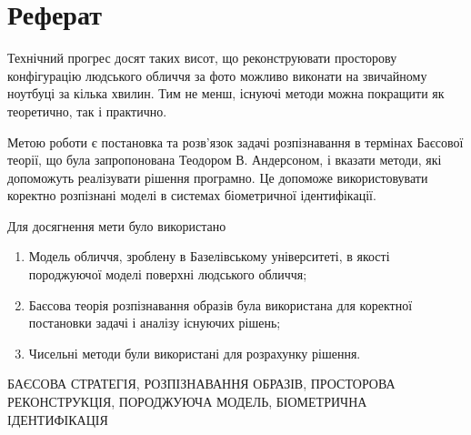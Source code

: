 \chapter*{Реферат}

Технічний прогрес досят таких висот,
що реконструювати просторову конфігурацію людського обличчя за фото
можливо виконати на звичайному ноутбуці за кілька хвилин.
Тим не менш, існуючі методи можна покращити як теоретично, так і практично.

Метою роботи є постановка та розв'язок задачі розпізнавання
в термінах Баєсової теорії, що була запропонована Теодором В. Андерсоном,
і вказати методи, які допоможуть реалізувати рішення програмно.
Це допоможе використовувати коректно розпізнані моделі
в системах біометричної ідентифікації.

Для досягнення мети було використано
\begin{enumerate}
  \item
    Модель обличчя, зроблену в Базелівському університеті,
    в якості породжуючої моделі поверхні людського обличчя;
  \item
    Баєсова теорія розпізнавання образів була використана
    для коректної постановки задачі і аналізу існуючих рішень;
  \item
    Чисельні методи були використані для розрахунку рішення.
\end{enumerate}

\MakeUppercase{Баєсова стратегія, розпізнавання образів,
просторова реконструкція, породжуюча модель,
біометрична ідентифікація}
